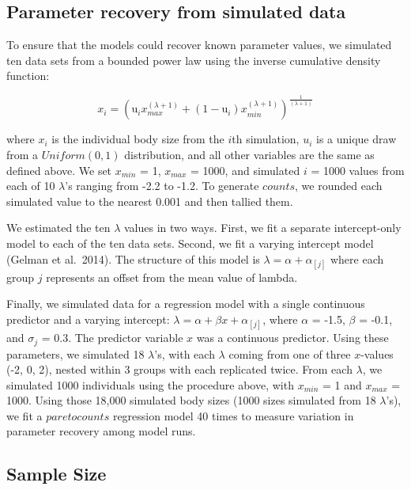 \documentclass[
  12pt,
]{article}
\begin{document}
\hypertarget{parameter-recovery-from-simulated-data}{%
\subsection{Parameter recovery from simulated
data}\label{parameter-recovery-from-simulated-data}}

To ensure that the models could recover known parameter values, we
simulated ten data sets from a bounded power law using the inverse
cumulative density function:

\begin{equation}
x_i = (\text{u}_ix_{max}^{(\lambda+1)} +  (1-\text{u}_i)  x_{min}^{(\lambda+1)} ) ^ {\frac{1}{(\lambda+1)}}
\end{equation}

where \(x_i\) is the individual body size from the \(i\)th simulation,
\(u_i\) is a unique draw from a \(Uniform(0,1)\) distribution, and all
other variables are the same as defined above. We set \(x_{min}\) = 1,
\(x_{max}\) = 1000, and simulated \(i\) = 1000 values from each of 10
\(\lambda\)'s ranging from -2.2 to -1.2. To generate \(counts\), we
rounded each simulated value to the nearest 0.001 and then tallied them.

We estimated the ten \(\lambda\) values in two ways. First, we fit a
separate intercept-only model to each of the ten data sets. Second, we
fit a varying intercept model (Gelman et al.~2014). The structure of
this model is \(\lambda = \alpha + \alpha_{[j]}\) where each group \(j\)
represents an offset from the mean value of lambda.

Finally, we simulated data for a regression model with a single
continuous predictor and a varying intercept:
\(\lambda = \alpha + \beta x + \alpha_{[j]}\), where \(\alpha\) = -1.5,
\(\beta\) = -0.1, and \(\sigma_{j}\) = 0.3. The predictor variable \(x\)
was a continuous predictor. Using these parameters, we simulated 18
\(\lambda\)'s, with each \(\lambda\) coming from one of three
\(x\)-values (-2, 0, 2), nested within 3 groups with each replicated
twice. From each \(\lambda\), we simulated 1000 individuals using the
procedure above, with \(x_{min}\) = 1 and \(x_{max}\) = 1000. Using
those 18,000 simulated body sizes (1000 sizes simulated from 18
\(\lambda\)'s), we fit a \(paretocounts\) regression model 40 times to
measure variation in parameter recovery among model runs.

\hypertarget{sample-size}{%
\subsection{Sample Size}\label{sample-size}}
\end{document}
